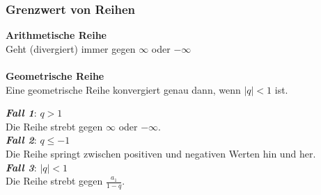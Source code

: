\subsubsection{Grenzwert von Reihen}
\textbf{Arithmetische Reihe}\\
Geht (divergiert) immer gegen $\infty$ oder $-\infty$
\\
\\
\textbf{Geometrische Reihe}\\
Eine geometrische Reihe konvergiert genau dann, wenn $|q| < 1$ ist.
\begin{flushleft}
    \textit{\textbf{Fall 1}}: $q > 1$ \\
    Die Reihe strebt gegen $\infty$ oder $-\infty$. \\[0.5em]
    \textit{\textbf{Fall 2}}: $q \leq -1$ \\
    Die Reihe springt zwischen positiven und negativen Werten hin und her. \\[0.5em]
    \textit{\textbf{Fall 3}}: $|q| < 1$ \\
    Die Reihe strebt gegen $\frac{a_1}{1-q}$.
\end{flushleft}
